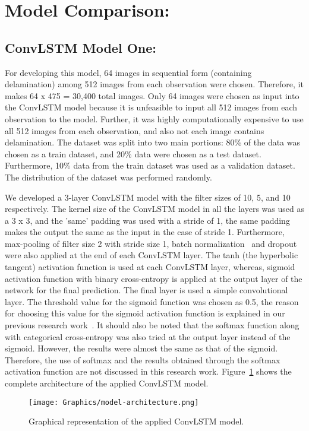 \section{Model Comparison:}
\subsection{ConvLSTM Model One:}

For developing this model, 64 images in sequential form (containing delamination) among 512 images from each observation were chosen.
Therefore, it makes 64 x 475 = 30,400 total images.
Only 64 images were chosen as input into the ConvLSTM model because it is unfeasible to input all 512 images from each observation to the model.
Further, it was highly computationally expensive to use all 512 images from each observation, and also not each image contains delamination.
The dataset was split into two main portions: 80\% of the data was chosen as a train dataset, and 20\% data were chosen as a test dataset. 
Furthermore, 10\% data from the train dataset was used as a validation dataset.
The distribution of the dataset was performed randomly. 

We developed a 3-layer ConvLSTM model with the filter sizes of 10, 5, and 10 respectively.
The kernel size of the ConvLSTM model in all the layers was used as a 3 x 3, and the 'same' padding was used with a stride of 1, the same padding makes the output the same as the input in the case of stride 1.
Furthermore, max-pooling of filter size 2 with stride size 1, batch normalization~\cite{santurkar2018does} and dropout~\cite{srivastava2014dropout} were also applied at the end of each ConvLSTM layer.  
The tanh (the hyperbolic tangent) activation function is used at each ConvLSTM layer, whereas, sigmoid activation function with binary cross-entropy is applied at the output layer of the network for the final prediction.
The final layer is used a simple convolutional layer.
The threshold value for the sigmoid function was chosen as 0.5, the reason for choosing this value for the sigmoid activation function is explained in our previous research work~\cite{ijjeh2021full}.
It should also be noted that the softmax function along with categorical cross-entropy was also tried at the output layer instead of the sigmoid. 
However, the results were almost the same as that of the sigmoid.
Therefore, the use of softmax and the results obtained through the softmax activation function are not discussed in this research work.
Figure~\ref{fig:model_one} shows the complete architecture of the applied ConvLSTM model.
\begin{figure} [h!]
	\begin{center}
		\texttt{[image: Graphics/model-architecture.png]}
	\end{center}
	\caption{Graphical representation of the applied ConvLSTM model.} 
	\label{fig:model_one}
\end{figure}

